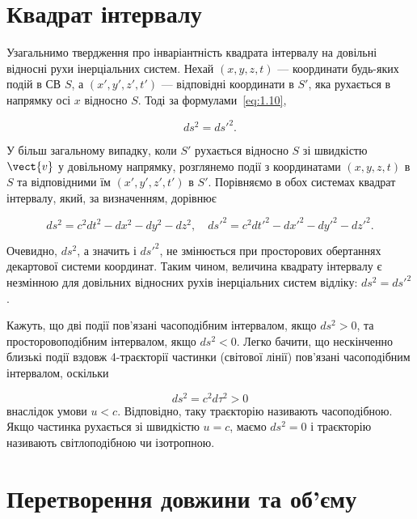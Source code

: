 \section{Квадрат інтервалу}

Узагальнимо твердження про інваріантність квадрата інтервалу на довільні відносні рухи інерціальних систем. Нехай $(x, y, z, t)$ --- координати будь-яких подій в СВ $S$, а $(x', y', z', t')$ --- відповідні координати в $S'$, яка рухається в напрямку осі $x$ відносно $S$. Тоді за формулами~\eqref{eq:1.10},

\begin{equation}
ds^2 = ds'^2.
\label{eq:1.14}
\end{equation}

У більш загальному випадку, коли $S'$ рухається відносно $S$ зі швидкістю $\vect{v}$ у довільному напрямку, розглянемо події з координатами $(x,y,z,t)$ в $S$ та відповідними їм $(x',y',z',t')$ в $S'$. Порівняємо в обох системах квадрат інтервалу, який, за визначенням, дорівнює

\begin{equation}
ds^2 = c^2 dt^2 - dx^2 - dy^2 - dz^2, \quad
ds'^2 = c^2 dt'^2 - dx'^2 - dy'^2 - dz'^2.
\label{eq:1.15}
\end{equation}

Очевидно, $ds^2$, а значить і $ds'^2$, не змінюється при просторових обертаннях декартової системи координат. Таким чином, величина квадрату інтервалу є незмінною для довільних відносних рухів інерціальних систем відліку: $ds^2 = ds'^2$.

Кажуть, що дві події пов'язані часоподібним інтервалом, якщо $ds^2 > 0$, та просторовоподібним інтервалом, якщо $ds^2 < 0$. Легко бачити, що нескінченно близькі події вздовж 4-траєкторії частинки (світової лінії) пов'язані часоподібним інтервалом, оскільки

\[
ds^2 = c^2 d\tau^2 > 0
\]
%
внаслідок умови $u < c$. Відповідно, таку траєкторію називають часоподібною. Якщо частинка рухається зі швидкістю $u = c$, маємо $ds^2 = 0$ і траєкторію називають світлоподібною чи ізотропною.

\section{Перетворення довжини та об'єму}

